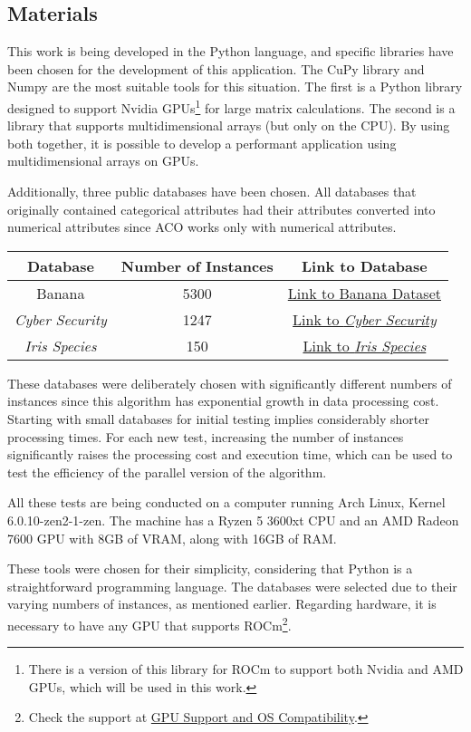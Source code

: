 \subsection{Materials} \label{Materials}

This work is being developed in the Python language, and specific libraries have been chosen for the development of this application. The CuPy library\cite{cupyLib} and Numpy\cite{numpyLib} are the most suitable tools for this situation. The first is a Python library designed to support Nvidia GPUs\footnote[1]{There is a version of this library for ROCm to support both Nvidia and AMD GPUs, which will be used in this work.} for large matrix calculations. The second is a library that supports multidimensional arrays (but only on the CPU). By using both together, it is possible to develop a performant application using multidimensional arrays on GPUs.

Additionally, three public databases have been chosen. All databases that originally contained categorical attributes had their attributes converted into numerical attributes since ACO works only with numerical attributes.

\begin{center}
    \begin{tabular}{|c|c|c|}
        \hline
        Database & Number of Instances & Link to Database \\
        \hline
        Banana & 5300 & \href{https://www.kaggle.com/datasets/saranchandar/standard-classification-banana-dataset}{Link to Banana Dataset} \\
        \hline
        \emph{Cyber Security} & 1247 & \href{https://www.kaggle.com/datasets/deepcontractor/cyber-security-salaries}{Link to \emph{Cyber Security}} \\
        \hline
        \emph{Iris Species} & 150 & \href{https://www.kaggle.com/datasets/uciml/iris}{Link to \emph{Iris Species}} \\
        \hline
    \end{tabular}
\end{center}

These databases were deliberately chosen with significantly different numbers of instances since this algorithm has exponential growth in data processing cost. Starting with small databases for initial testing implies considerably shorter processing times. For each new test, increasing the number of instances significantly raises the processing cost and execution time, which can be used to test the efficiency of the parallel version of the algorithm.

All these tests are being conducted on a computer running Arch Linux, Kernel 6.0.10-zen2-1-zen. The machine has a Ryzen 5 3600xt CPU and an AMD Radeon 7600 GPU with 8GB of VRAM, along with 16GB of RAM.

These tools were chosen for their simplicity, considering that Python is a straightforward programming language. The databases were selected due to their varying numbers of instances, as mentioned earlier. Regarding hardware, it is necessary to have any GPU that supports ROCm\footnote[2]{Check the support at \href{https://rocm.docs.amd.com/en/latest/release/gpu_os_support.html}{GPU Support and OS Compatibility}.}.
